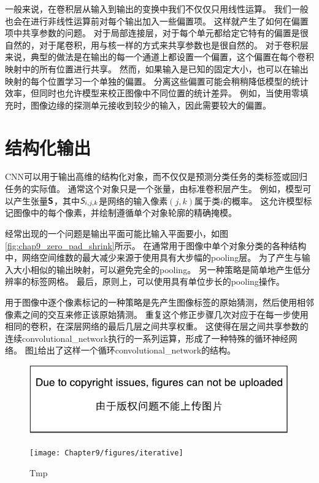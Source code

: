  
一般来说，在卷积层从输入到输出的变换中我们不仅仅只用线性运算。
我们一般也会在进行非线性运算前对每个输出加入一些偏置项。
这样就产生了如何在偏置项中共享参数的问题。
对于局部连接层，对于每个单元都给定它特有的偏置是很自然的，对于尾卷积，用与核一样的方式来共享参数也是很自然的。
对于卷积层来说，典型的做法是在输出的每一个通道上都设置一个偏置，这个偏置在每个卷积映射中的所有位置进行共享。
然而，如果输入是已知的固定大小，也可以在输出映射的每个位置学习一个单独的偏置。
分离这些偏置可能会稍稍降低模型的统计效率，但同时也允许模型来校正图像中不同位置的统计差异。
例如，当使用零填充时，图像边缘的探测单元接收到较少的输入，因此需要较大的偏置。

\section{结构化输出}
\label{sec:structured_outputs}

\gls{CNN}可以用于输出高维的结构化对象，而不仅仅是预测分类任务的类标签或回归任务的实际值。
通常这个对象只是一个张量，由标准卷积层产生。
例如，模型可以产生张量$\textsf{\textbf{S}}$，其中$\textit{\textsf{S}}_{i,j,k}$是网络的输入像素$(j, k)$属于类$i$的概率。
这允许模型标记图像中的每个像素，并绘制遵循单个对象轮廓的精确掩模。

经常出现的一个问题是输出平面可能比输入平面要小，如图\ref{fig:chap9_zero_pad_shrink}所示。
在通常用于图像中单个对象分类的各种结构中，网络空间维数的最大减少来源于使用具有大步幅的\gls{pooling}层。
为了产生与输入大小相似的输出映射，可以避免完全的\gls{pooling}\citep{jain2007supervised}。
另一种策略是简单地产生低分辨率的标签网格\citep{Pinheiro+Collobert-ICML2014,Pinheiro+Collobert-CVPR2015}。
最后，原则上，可以使用具有单位步长的\gls{pooling}操作。

用于图像中逐个像素标记的一种策略是先产生图像标签的原始猜测，然后使用相邻像素之间的交互来修正该原始猜测。
重复这个修正步骤几次对应于在每一步使用相同的卷积，在深层网络的最后几层之间共享权重\citep{jain2007supervised}。
这使得在层之间共享参数的连续\gls{convolutional_network}执行的一系列运算，形成了一种特殊的循环神经网络\citep{Pinheiro+Collobert-ICML2014,Pinheiro+Collobert-CVPR2015}。
图\ref{fig:chap9_iterative}给出了这样一个循环\gls{convolutional_network}的结构。
\begin{figure}[!htb]
\ifOpenSource
\centerline{\includegraphics{figure.pdf}}
\else
\centerline{\texttt{[image: Chapter9/figures/iterative]}}
\fi
\caption{Tmp}
\label{fig:chap9_iterative}
\end{figure}

